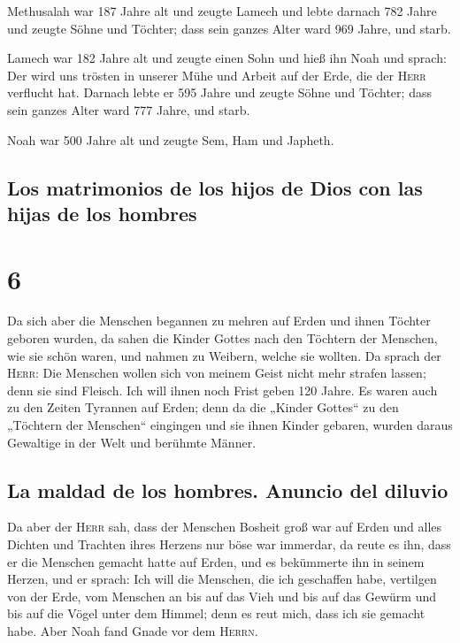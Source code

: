  Methusalah war 187 Jahre alt und zeugte Lamech
 und lebte darnach 782 Jahre und zeugte Söhne und
Töchter;  dass sein ganzes Alter ward 969 Jahre, und
starb.

 Lamech war 182 Jahre alt und zeugte einen Sohn
 und hieß ihn Noah und sprach: Der wird uns trösten in
unserer Mühe und Arbeit auf der Erde, die der \textsc{Herr} verflucht
hat.  Darnach lebte er 595 Jahre und zeugte Söhne und
Töchter;  dass sein ganzes Alter ward 777 Jahre, und
starb.

 Noah war 500 Jahre alt und zeugte Sem, Ham und Japheth.

\hypertarget{los-matrimonios-de-los-hijos-de-dios-con-las-hijas-de-los-hombres}{%
\subsection{Los matrimonios de los hijos de Dios con las hijas de los
hombres}\label{los-matrimonios-de-los-hijos-de-dios-con-las-hijas-de-los-hombres}}

\hypertarget{section-5}{%
\section{6}\label{section-5}}

 Da sich aber die Menschen begannen zu mehren auf Erden
und ihnen Töchter geboren wurden,  da sahen die Kinder
Gottes nach den Töchtern der Menschen, wie sie schön waren, und nahmen
zu Weibern, welche sie wollten.  Da sprach der
\textsc{Herr}: Die Menschen wollen sich von meinem Geist nicht mehr
strafen lassen; denn sie sind Fleisch. Ich will ihnen noch Frist geben
120 Jahre.  Es waren auch zu den Zeiten Tyrannen auf
Erden; denn da die „Kinder Gottes`` zu den „Töchtern der Menschen``
eingingen und sie ihnen Kinder gebaren, wurden daraus Gewaltige in der
Welt und berühmte Männer.

\hypertarget{la-maldad-de-los-hombres.-anuncio-del-diluvio}{%
\subsection{La maldad de los hombres. Anuncio del
diluvio}\label{la-maldad-de-los-hombres.-anuncio-del-diluvio}}

 Da aber der \textsc{Herr} sah, dass der Menschen Bosheit
groß war auf Erden und alles Dichten und Trachten ihres Herzens nur böse
war immerdar,  da reute es ihn, dass er die Menschen
gemacht hatte auf Erden, und es bekümmerte ihn in seinem Herzen,
 und er sprach: Ich will die Menschen, die ich geschaffen
habe, vertilgen von der Erde, vom Menschen an bis auf das Vieh und bis
auf das Gewürm und bis auf die Vögel unter dem Himmel; denn es reut
mich, dass ich sie gemacht habe.  Aber Noah fand Gnade vor
dem \textsc{Herrn}.

